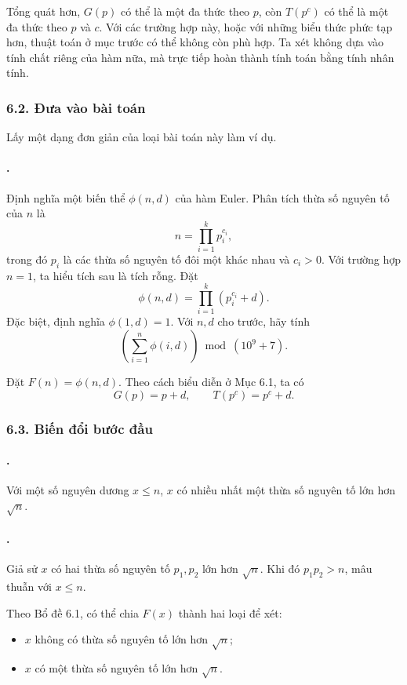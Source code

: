 \documentclass[11pt]{article}
\begin{document}
Tổng quát hơn, \(G(p)\) có thể là một đa thức theo \(p\), còn \(T(p^c)\) có
thể là một đa thức theo \(p\) và \(c\). Với các trường hợp này, hoặc với những
biểu thức phức tạp hơn, thuật toán ở mục trước có thể không còn phù hợp. Ta
xét không dựa vào tính chất riêng của hàm nữa, mà trực tiếp hoàn thành tính
toán bằng tính nhân tính.

\subsubsection*{6.2. Đưa vào bài toán}

Lấy một dạng đơn giản của loại bài toán này làm ví dụ.

\paragraph{.}
Định nghĩa một biến thể \(\phi(n,d)\) của hàm Euler. Phân tích thừa số nguyên
tố của \(n\) là
\[
  n=\prod_{i=1}^{k}p_i^{c_i},
\]
trong đó \(p_i\) là các thừa số nguyên tố đôi một khác nhau và \(c_i>0\). Với
trường hợp \(n=1\), ta hiểu tích sau là tích rỗng. Đặt
\[
  \phi(n,d)=\prod_{i=1}^{k}(p_i^{c_i}+d).
\]
Đặc biệt, định nghĩa \(\phi(1,d)=1\). Với \(n,d\) cho trước, hãy tính
\[
  \left(\sum_{i=1}^{n}\phi(i,d)\right)\bmod (10^9+7).
\]

Đặt \(F(n)=\phi(n,d)\). Theo cách biểu diễn ở Mục 6.1, ta có
\[
  G(p)=p+d,\qquad T(p^c)=p^c+d.
\]

\subsubsection*{6.3. Biến đổi bước đầu}

\paragraph{.}
Với một số nguyên dương \(x\le n\), \(x\) có nhiều nhất một thừa số nguyên tố
lớn hơn \(\sqrt n\).

\paragraph{.}
Giả sử \(x\) có hai thừa số nguyên tố \(p_1,p_2\) lớn hơn \(\sqrt n\). Khi đó
\(p_1p_2>n\), mâu thuẫn với \(x\le n\).

Theo Bổ đề 6.1, có thể chia \(F(x)\) thành hai loại để xét:
\begin{itemize}
  \item \(x\) không có thừa số nguyên tố lớn hơn \(\sqrt n\);
  \item \(x\) có một thừa số nguyên tố lớn hơn \(\sqrt n\).
\end{itemize}
\end{document}
